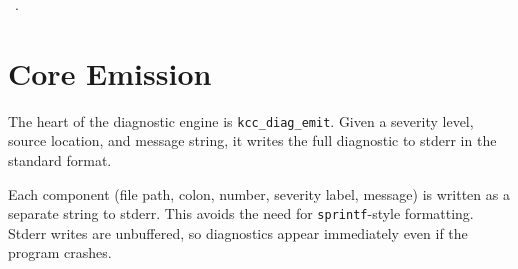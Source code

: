 \documentclass[11pt,a4paper,twoside,openright,DIV=15]{scrbook}
\theoremstyle{definition}
\theoremstyle{plain}
\theoremstyle{remark}
\begin{document}
\begin{flushleft}
\begin{minipage}{\linewidth}
\vspace{-1.5ex}
\footnotesize
\begin{list}{}{\setlength{\itemsep}{-\parsep}\setlength{\itemindent}{-\leftmargin}}
\item \NWtxtMacroRefIn\ .

\item{}
\end{list}
\end{minipage}\vspace{4ex}
\end{flushleft}
\section{Core Emission}

The heart of the diagnostic engine is \texttt{kcc\_diag\_emit}.  Given
a severity level, source location, and message string, it writes the
full diagnostic to stderr in the standard format.

Each component (file path, colon, number, severity label, message) is
written as a separate string to stderr.  This avoids the need for
\texttt{sprintf}-style formatting.  Stderr writes are unbuffered, so
diagnostics appear immediately even if the program crashes.
\end{document}
